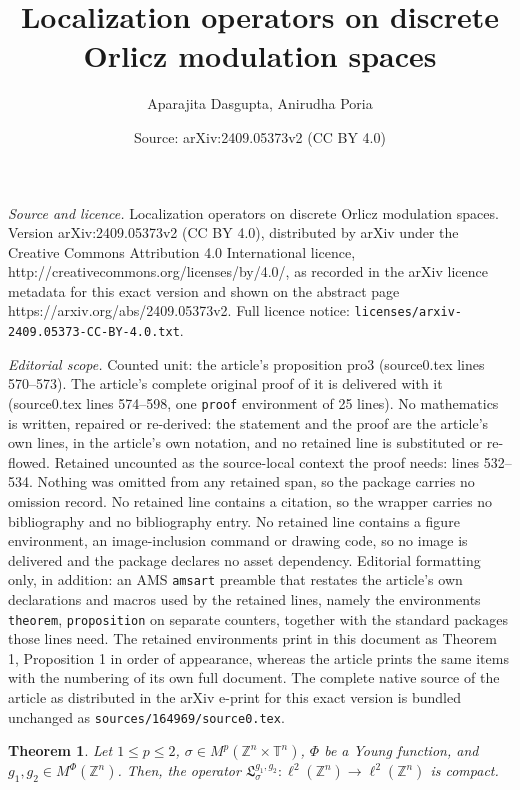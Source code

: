 \documentclass[10pt,a4paper]{amsart}
\title{Localization operators on discrete Orlicz modulation spaces}
\author{Aparajita Dasgupta, Anirudha Poria}
\date{Source: arXiv:2409.05373v2 (CC BY 4.0)}
\newtheorem{theorem}{Theorem}
\def \T{{\mathbb T}}
\def \Z{{\mathbb Z}}
\begin{document}
\maketitle

\noindent\emph{Source and licence.} Localization operators on discrete Orlicz modulation spaces. Version arXiv:2409.05373v2 (CC BY 4.0), distributed by arXiv under the Creative Commons Attribution 4.0 International licence, http://creativecommons.org/licenses/by/4.0/, as recorded in the arXiv licence metadata for this exact version and shown on the abstract page https://arxiv.org/abs/2409.05373v2. Full licence notice: \texttt{licenses/arxiv-2409.05373-CC-BY-4.0.txt}.\par\smallskip

\noindent\textit{Editorial scope.} Counted unit: the article's proposition pro3 (source0.tex lines 570--573). The article's complete original proof of it is delivered with it (source0.tex lines 574--598, one \texttt{proof} environment of 25 lines). No mathematics is written, repaired or re-derived: the statement and the proof are the article's own lines, in the article's own notation, and no retained line is substituted or re-flowed.  Retained uncounted as the source-local context the proof needs: lines 532--534.  Nothing was omitted from any retained span, so the package carries no omission record.  No retained line contains a citation, so the wrapper carries no bibliography and no bibliography entry.  No retained line contains a figure environment, an image-inclusion command or drawing code, so no image is delivered and the package declares no asset dependency.  Editorial formatting only, in addition: an AMS \texttt{amsart} preamble that restates the article's own declarations and macros used by the retained lines, namely the environments \texttt{theorem}, \texttt{proposition} on separate counters, together with the standard packages those lines need.  The retained environments print in this document as Theorem 1, Proposition 1 in order of appearance, whereas the article prints the same items with the numbering of its own full document.  The complete native source of the article as distributed in the arXiv e-print for this exact version is bundled unchanged as \texttt{sources/164969/source0.tex}.
\begin{theorem}\label{th2}
Let $1 \leq p \leq 2$, $\sigma \in M^p(\Z^n \times \T^n)$, $\Phi$ be a Young function, and $g_1, g_2 \in  M^{\Phi}(\Z^n)$. Then, the operator $\mathfrak{L}^{g_1, g_2}_{\sigma}: \ell^2(\Z^n) \to \ell^2(\Z^n) $ is compact. 
\end{theorem}  
\end{document}
